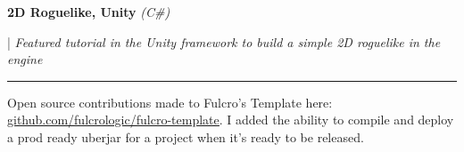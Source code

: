 \documentclass[letterpaper,11pt]{article}
\begin{document}
\begin{minipage}[t]{0.28\textwidth}
    \raggedright
    \textbf{ 2D Roguelike, Unity }\textit{(C\#)} \\
\end{minipage}
\hfill
\begin{minipage}[t]{0.70\textwidth}
    \raggedright
    |\textit{ Featured tutorial in the Unity framework to build a simple 2D roguelike in the engine} \\
\end{minipage}
\noindent\rule{19.5cm}{0.4pt}
Open source contributions made to Fulcro’s Template here:
\href{https://github.com/fulcrologic/fulcro-template}{\underline{github.com/fulcrologic/fulcro-template}}. I added the ability to compile and deploy a prod ready uberjar for a project when it's ready to be released.


\end{document}
